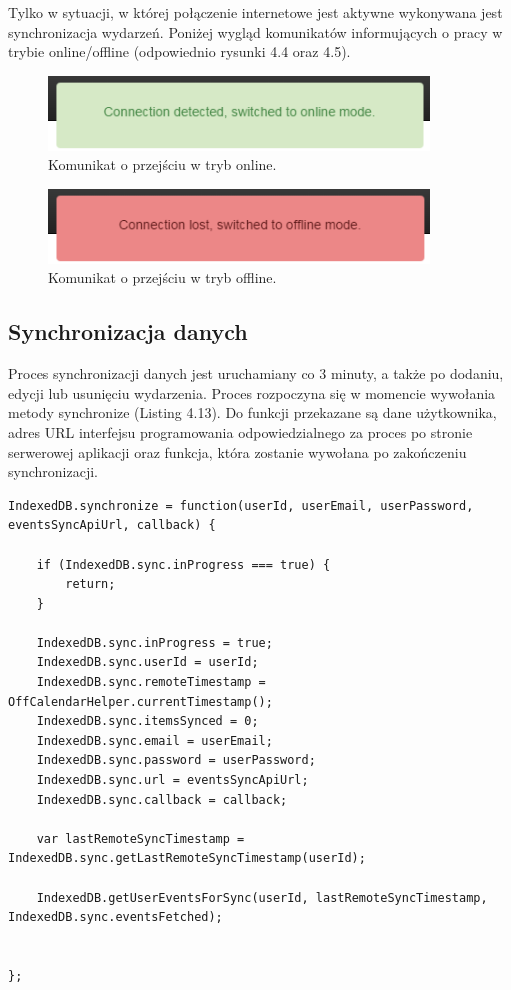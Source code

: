 Tylko w sytuacji, w której połączenie internetowe jest aktywne wykonywana jest synchronizacja wydarzeń. Poniżej wygląd komunikatów informujących o pracy w trybie online/offline (odpowiednio rysunki 4.4 oraz 4.5).

\begin{figure}[H]
\centering
\includegraphics[width=0.9\textwidth]{isOnline.png}
\caption{Komunikat o przejściu w tryb online.}
\end{figure}

\begin{figure}[H]
\centering
\includegraphics[width=0.9\textwidth]{isOffline.png}
\caption{Komunikat o przejściu w tryb offline.}
\end{figure}

\subsection{Synchronizacja danych}
\label{autSynDanych}

Proces synchronizacji danych jest uruchamiany co 3 minuty, a także po dodaniu, edycji lub usunięciu wydarzenia. Proces rozpoczyna się w momencie wywołania metody synchronize (Listing 4.13). Do funkcji przekazane są dane użytkownika, adres URL interfejsu programowania odpowiedzialnego za proces po stronie serwerowej aplikacji oraz funkcja, która zostanie wywołana po zakończeniu synchronizacji.

\begin{lstlisting}[style=js, caption=Funkcja synchronize rozpoczynająca proces synchronizacji., label=amb, captionpos=b]
IndexedDB.synchronize = function(userId, userEmail, userPassword, eventsSyncApiUrl, callback) {

	if (IndexedDB.sync.inProgress === true) {
    	return;
	}

	IndexedDB.sync.inProgress = true;
	IndexedDB.sync.userId = userId;
	IndexedDB.sync.remoteTimestamp = OffCalendarHelper.currentTimestamp();
	IndexedDB.sync.itemsSynced = 0;
	IndexedDB.sync.email = userEmail;
	IndexedDB.sync.password = userPassword;
	IndexedDB.sync.url = eventsSyncApiUrl;
	IndexedDB.sync.callback = callback;

	var lastRemoteSyncTimestamp = IndexedDB.sync.getLastRemoteSyncTimestamp(userId);

	IndexedDB.getUserEventsForSync(userId, lastRemoteSyncTimestamp, IndexedDB.sync.eventsFetched);


};
\end{lstlisting}

